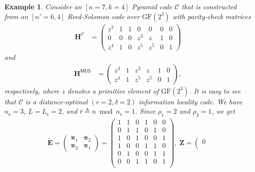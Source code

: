 \documentclass[twocolumn,conference]{IEEEtran}
\newtheorem{example}{Example}
\newcommand{\eqdef}{\triangleq}              %
\newcommand{\GF}{\mathrm{GF}}                %
\newcommand{\code}[1]{\mathcal{#1}}          %
\begin{document}
\begin{example}
  Consider an $[n=7,k=4]$ Pyramid code $\mathcal C$ that is constructed from an $[n'=6,4]$ Reed-Solomon code over $\GF(2^3)$ with
  parity-check matrices
  \begin{align*}
      \bm H^{\mathcal C}&=\left(\begin{matrix}
          z^3 & 1 & 1 & 0   & 0   & 0 & 0\\
          0   & 0 & 0 & z^3 & z   & 1 & 0\\
          z^4 & 1 & 0 & z^5 & z^5 & 0 & 1
        \end{matrix}\right)
  \end{align*}
  and
   \begin{align*} 
                \bm H^{\mathsf{MDS}}&=\left(\begin{matrix}
          z^3 & 1 & z^3 & z & 1 & 0\\
          z^4 & 1 & z^5 & z^5 & 0 & 1
        \end{matrix}\right),
  \end{align*}
respectively, where $z$ denotes a primitive element of $\GF(2^3)$. It is easy to see that $\code{C}$ is a distance-optimal
  $(r=2,\delta=2)$ information locality code. We have $n_\mathsf{c}=3$, $L=L_{\mathsf c}=2$, and
  $\bar r\eqdef n\bmod n_\mathsf{c}=1$. Since $\rho_1=2$ and $\rho_2=1$, we get
  \begin{align*}
    \tilde{\bm E}=\left(\begin{matrix}
        \bm \pi_1 & \bm \pi_2\\
        \bm \pi_2 & \bm \pi_1
      \end{matrix}\right)=\left(\begin{array}{ccc|ccc}
                                  1 & 1 & 0 & 1 & 0 & 0\\
                                  0 & 1 & 1 & 0 & 1 & 0\\
                                  1 & 0 & 1 & 0 & 0 & 1\\
                                  \hline
                                  1 & 0 & 0 & 1 & 1 & 0\\
                                  0 & 1 & 0 & 0 & 1 & 1\\
                                  0 & 0 & 1 & 1 & 0 & 1\\
                                \end{array}\right), \;\bm Z=\left(\begin{matrix}
                                  0\\

\end{matrix}
\end{align*}
\end{example}
\end{document}
